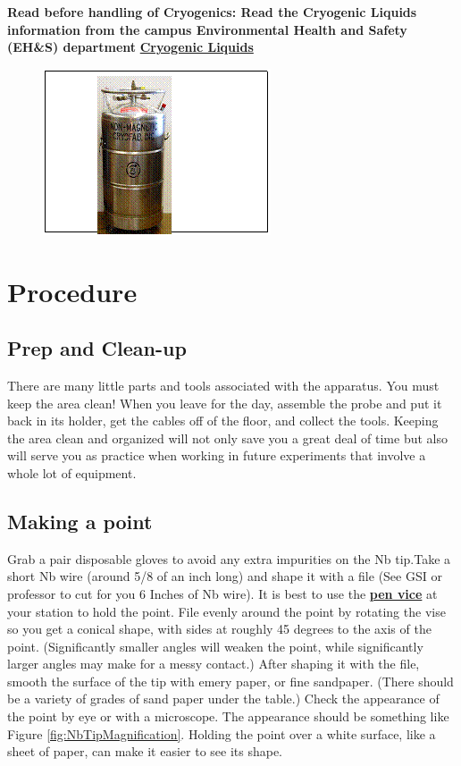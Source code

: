 \documentclass{../lab}
\begin{document}
\textbf{Read before handling of Cryogenics: Read the Cryogenic Liquids information from the campus Environmental Health and Safety (EH\&S) department } \href{http://experimentationlab.berkeley.edu/sites/default/files/images/77cryogenic.pdf}{\textbf{Cryogenic Liquids}}

\begin{figure}[h]
    \centering
    \href{http://experimentationlab.berkeley.edu/sites/default/files/images/JOS10.gif}{\includegraphics[width=0.4\linewidth]{images/JOS10.png}}
    \caption{}
    \label{fig:JOS10}
\end{figure}

\section{Procedure}

\subsection{Prep and Clean-up}

There are many little parts and tools associated with the apparatus. You must keep the area clean! When you leave for the day, assemble the probe and put it back in its holder, get the cables off of the floor, and collect the tools. Keeping the area clean and organized will not only save you a great deal of time but also will serve you as practice when working in future experiments that involve a whole lot of equipment.

\subsection{Making a point}

Grab a pair disposable gloves to avoid any extra impurities on the Nb tip.Take a short Nb wire (around 5/8 of an inch long) and shape it with a file (See GSI or professor to cut for you 6 Inches of Nb wire). It is best to use the \href{http://experimentationlab.berkeley.edu/sites/default/files/JOS/vicepen\_0.jpeg}{\textbf{pen vice}} at your station to hold the point. File evenly around the point by rotating the vise so you get a conical shape, with sides at roughly 45 degrees to the axis of the point. (Significantly smaller angles will weaken the point, while significantly larger angles may make for a messy contact.) After shaping it with the file, smooth the surface of the tip with emery paper, or fine sandpaper. (There should be a variety of grades of sand paper under the table.) Check the appearance of the point by eye or with a microscope. The appearance should be something like Figure \ref{fig:NbTipMagnification}. Holding the point over a white surface, like a sheet of paper, can make it easier to see its shape.
\end{document}
